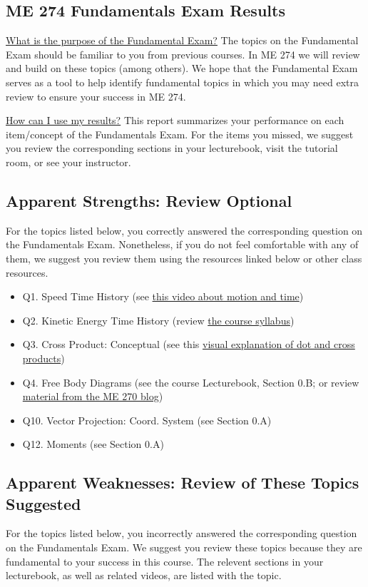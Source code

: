 \documentclass[11pt,letterpaper]{article}\usepackage[]{graphicx}\usepackage[]{color}
\begin{document}
\subsection*{ME 274 Fundamentals Exam Results}
\underline{What is the purpose of the Fundamental Exam?}  The topics on the Fundamental Exam should be familiar to you from previous courses.  In ME 274 we will review and build on these topics (among others). We hope that the Fundamental Exam serves as a tool to help identify fundamental topics in which you may need extra review to ensure your success in ME 274.\

\underline{How can I use my results?}  This report summarizes your performance on each item/concept of the Fundamentals Exam.  For the items you missed, we suggest you review the corresponding sections in your lecturebook, visit the tutorial room, or see your instructor.

\subsection*{Apparent Strengths: Review Optional}
For the topics listed below, you correctly answered the corresponding question on the Fundamentals Exam.  Nonetheless, if you do not feel comfortable with any of them, we suggest you review them using the resources linked below or other class resources.

\begin{itemize}\item Q1. Speed Time History (see \href{https://www.youtube.com/watch?v=lZPtFDXYQRU}{this video about motion and time})
\item Q2. Kinetic Energy Time History (review \href{https://www.purdue.edu/freeform/dynamics/wp-content/uploads/sites/4/2018/01/Syllabus-Spring-2018.pdf}{the course syllabus})
\item Q3. Cross Product: Conceptual (see this \href{https://www.youtube.com/watch?v=h0NJK4mEIJU&t=8s}{visual explanation of dot and cross products})
\item Q4. Free Body Diagrams (see the course Lecturebook, Section 0.B; or review \href{https://www.purdue.edu/statics/}{material from the ME 270 blog})
\item Q10. Vector Projection: Coord. System (see Section 0.A)
\item Q12. Moments (see Section 0.A)
\end{itemize}\subsection*{Apparent Weaknesses: Review of These Topics Suggested}
For the topics listed below, you incorrectly answered the corresponding question on the Fundamentals Exam.  We suggest you review these topics because they are fundamental to your success in this course.  The relevent sections in your lecturebook, as well as related videos, are listed with the topic.
\end{document}
